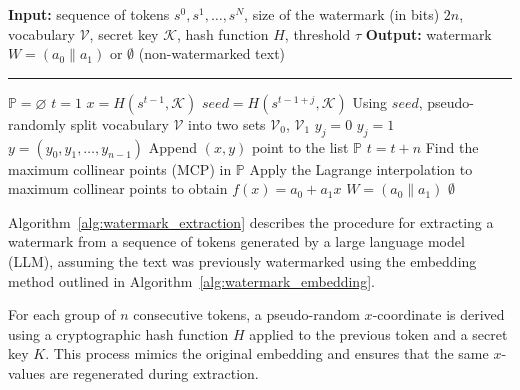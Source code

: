 \documentclass[a4paper,11pt]{llncs}
\begin{document}
\begin{algorithm*}[htbp]
\caption{Watermark Extraction}
\label{alg:watermark_extraction}
\begin{algorithmic}[1]
\State \textbf{Input:} sequence of tokens $s^{0}, s^{1}, \dots, s^{N}$, size of the watermark (in bits) $2n$, vocabulary $\mathcal{V}$, secret key $\mathcal{K}$, hash function $H$, threshold $\tau$
\State \textbf{Output:} watermark $W=(a_0\|a_1)$ or $\emptyset$ (non-watermarked text)
    \vspace{2mm}
    \hrule
    \vspace{2mm}
    \State $\mathbb{P}=\varnothing$ 
    \State $t=1$ 
        \State $x = H(s^{t-1}, \mathcal{K})$ 
         
            \State $seed = H(s^{t-1+j}, \mathcal{K})$
            \State Using $seed$, pseudo-randomly split vocabulary $\mathcal{V}$ into two sets $\mathcal{V}_0$, $\mathcal{V}_1$
                \State $y_j = 0$ 
            \Else
                \State $y_j = 1$
            \EndIf
        \EndFor
        \State $y=(y_{0},y_{1},\ldots,y_{n-1})$
        \State Append $(x,y)$ point to the list $\mathbb{P}$
        \State $t=t+n$
    \EndWhile
    \State Find the maximum collinear points (MCP) in $\mathbb{P}$
    \State Apply the Lagrange interpolation to maximum collinear points to obtain $f(x)=a_0+a_1x$
        \State \Return $W=(a_0\|a_1)$
    \Else
        \State \Return $\emptyset$
    \EndIf
\end{algorithmic}
\end{algorithm*}

Algorithm~\ref{alg:watermark_extraction} describes the procedure for extracting a watermark from a sequence of tokens generated by a large language model (LLM), assuming the text was previously watermarked using the embedding method outlined in Algorithm~\ref{alg:watermark_embedding}. 

For each group of $n$ consecutive tokens, a pseudo-random $x$-coordinate is derived using a cryptographic hash function $H$ applied to the previous token and a secret key $K$. This process mimics the original embedding and ensures that the same $x$-values are regenerated during extraction.
\end{document}
